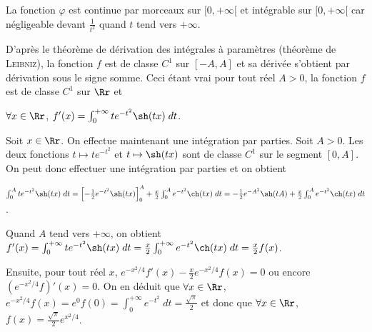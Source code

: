{{La fonction $\varphi$ est continue par morceaux sur $[0,+\infty[$ et intégrable sur $[0,+\infty[$ car négligeable devant $\frac{1}{t^2}$ quand $t$ tend vers $+\infty$.

D'après le théorème de dérivation des intégrales à paramètres (théorème de \textsc{Leibniz}), la fonction $f$ est de classe $C^1$ sur $[-A,A]$ et sa dérivée s'obtient par dérivation sous le signe somme. Ceci étant vrai pour tout réel $A>0$, la fonction $f$ est de classe $C^1$ sur $\Rr$ et

\begin{center}
$\forall x\in\Rr$, $f'(x)=\int_{0}^{+\infty}te^{-t^2}\sh(tx)\;dt$.
\end{center}

Soit $x\in\Rr$. On effectue maintenant une intégration par parties. Soit $A>0$. Les deux fonctions $t\mapsto te^{-t^2}$ et $t\mapsto\sh(tx)$ sont de classe $C^1$ sur le segment $[0,A]$. On peut donc effectuer une intégration par parties et on obtient

\begin{center}
$\int_{0}^{A}te^{-t^2}\sh(tx)\;dt=\left[-\frac{1}{2}e^{-t^2}\sh(tx)\right]_0^A+\frac{x}{2}\int_{0}^{A}e^{-t^2}\ch(tx)\;dt=-\frac{1}{2}e^{-A^2}\sh(tA)+\frac{x}{2}\int_{0}^{A}e^{-t^2}\ch(tx)\;dt$.
\end{center}

Quand $A$ tend vers $+\infty$, on obtient $f'(x)=\int_{0}^{+\infty}te^{-t^2}\sh(tx)\;dt=\frac{x}{2}\int_{0}^{+\infty}e^{-t^2}\ch(tx)\;dt=\frac{x}{2}f(x)$.

Ensuite, pour tout réel $x$, $e^{-x^2/4}f'(x)-\frac{x}{2}e^{-x^2/4}f(x)=0$ ou encore $(e^{-x^2/4}f)'(x)=0$. On en déduit que $\forall x\in\Rr$, $e^{-x^2/4}f(x)=e^0f(0)=\int_{0}^{+\infty}e^{-t^2}\;dt=\frac{\sqrt{\pi}}{2}$ et donc que $\forall x\in\Rr$, $f(x)=\frac{\sqrt{\pi}}{2}e^{x^2/4}$.

\begin{center}
\end{center}
}
}
